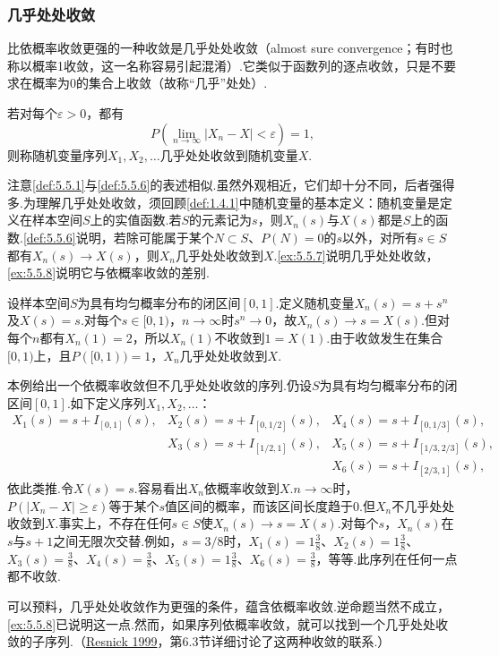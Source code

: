 \subsubsection{几乎处处收敛}\label{sec:5.5.2}
比依概率收敛更强的一种收敛是几乎处处收敛（almost sure convergence；有时也称以概率1收敛，这一名称容易引起混淆）.它类似于函数列的逐点收敛，只是不要求在概率为0的集合上收敛（故称“几乎”处处）.
\begin{definition}\label{def:5.5.6}
若对每个$\varepsilon>0$，都有
$$P\left(\lim_{n\to\infty}|X_n-X|<\varepsilon\right)=1,$$
则称随机变量序列$X_1,X_2,\ldots$几乎处处收敛到随机变量$X$.
\end{definition}
注意\autoref{def:5.5.1}与\autoref{def:5.5.6}的表述相似.虽然外观相近，它们却十分不同，后者强得多.为理解几乎处处收敛，须回顾\autoref{def:1.4.1}中随机变量的基本定义：随机变量是定义在样本空间$S$上的实值函数.若$S$的元素记为$s$，则$X_n(s)$与$X(s)$都是$S$上的函数.\autoref{def:5.5.6}说明，若除可能属于某个$N\subset S$、$P(N)=0$的$s$以外，对所有$s\in S$都有$X_n(s)\to X(s)$，则$X_n$几乎处处收敛到$X$.\autoref{ex:5.5.7}说明几乎处处收敛，\autoref{ex:5.5.8}说明它与依概率收敛的差别.
\begin{example}[几乎处处收敛]\label{ex:5.5.7}
设样本空间$S$为具有均匀概率分布的闭区间$[0,1]$.定义随机变量$X_n(s)=s+s^n$及$X(s)=s$.对每个$s\in[0,1)$，$n\to\infty$时$s^n\to0$，故$X_n(s)\to s=X(s)$.但对每个$n$都有$X_n(1)=2$，所以$X_n(1)$不收敛到$1=X(1)$.由于收敛发生在集合$[0,1)$上，且$P([0,1))=1$，$X_n$几乎处处收敛到$X$.
\end{example}
\begin{example}[依概率收敛但不几乎处处收敛]\label{ex:5.5.8}
本例给出一个依概率收敛但不几乎处处收敛的序列.仍设$S$为具有均匀概率分布的闭区间$[0,1]$.如下定义序列$X_1,X_2,\ldots$：
$$\begin{array}{lll}
X_1(s)=s+I_{[0,1]}(s),&X_2(s)=s+I_{[0,1/2]}(s),&X_4(s)=s+I_{[0,1/3]}(s),\\
&X_3(s)=s+I_{[1/2,1]}(s),&X_5(s)=s+I_{[1/3,2/3]}(s),\\
&&X_6(s)=s+I_{[2/3,1]}(s),
\end{array}$$
依此类推.令$X(s)=s$.容易看出$X_n$依概率收敛到$X$.$n\to\infty$时，$P(|X_n-X|\ge\varepsilon)$等于某个$s$值区间的概率，而该区间长度趋于0.但$X_n$不几乎处处收敛到$X$.事实上，不存在任何$s\in S$使$X_n(s)\to s=X(s)$.对每个$s$，$X_n(s)$在$s$与$s+1$之间无限次交替.例如，$s=3/8$时，$X_1(s)=1\frac38$、$X_2(s)=1\frac38$、$X_3(s)=\frac38$、$X_4(s)=\frac38$、$X_5(s)=1\frac38$、$X_6(s)=\frac38$，等等.此序列在任何一点都不收敛.
\end{example}
可以预料，几乎处处收敛作为更强的条件，蕴含依概率收敛.逆命题当然不成立，\autoref{ex:5.5.8}已说明这一点.然而，如果序列依概率收敛，就可以找到一个几乎处处收敛的子序列.（\hyperref[bib:source251]{Resnick 1999}，第6.3节详细讨论了这两种收敛的联系.）


